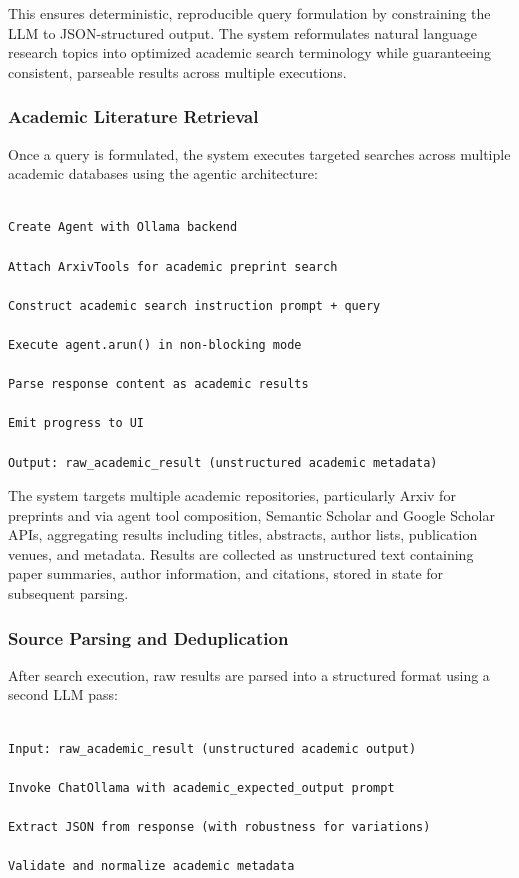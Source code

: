 This ensures deterministic, reproducible query formulation by constraining the LLM to JSON-structured output. The system reformulates natural language research topics into optimized academic search terminology while guaranteeing consistent, parseable results across multiple executions.

\subsubsection{Academic Literature Retrieval}

Once a query is formulated, the system executes targeted searches across multiple academic databases using the agentic architecture:

\begin{lstlisting}

Create Agent with Ollama backend

Attach ArxivTools for academic preprint search

Construct academic search instruction prompt + query

Execute agent.arun() in non-blocking mode

Parse response content as academic results

Emit progress to UI

Output: raw_academic_result (unstructured academic metadata)
\end{lstlisting}

The system targets multiple academic repositories, particularly Arxiv for preprints and via agent tool composition, Semantic Scholar and Google Scholar APIs, aggregating results including titles, abstracts, author lists, publication venues, and metadata. Results are collected as unstructured text containing paper summaries, author information, and citations, stored in state for subsequent parsing.

\subsubsection{Source Parsing and Deduplication}

After search execution, raw results are parsed into a structured format using a second LLM pass:

\begin{lstlisting}

Input: raw_academic_result (unstructured academic output)

Invoke ChatOllama with academic_expected_output prompt

Extract JSON from response (with robustness for variations)

Validate and normalize academic metadata

\end{lstlisting}



